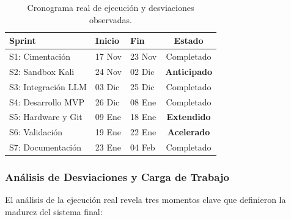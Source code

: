 \begin{table}[H]
\centering
\renewcommand{\arraystretch}{1.2}
\begin{tabular}{|l|l|l|c|}
\hline
\rowcolor[gray]{0.9} \textbf{Sprint} & \textbf{Inicio} & \textbf{Fin} & \textbf{Estado} \\ \hline
S1: Cimentación & 17 Nov & 23 Nov & Completado \\ \hline
\rowcolor[HTML]{E2EFDA} S2: Sandbox Kali & 24 Nov & 02 Dic & \textbf{Anticipado} \\ \hline
S3: Integración LLM & 03 Dic & 25 Dic & Completado \\ \hline
S4: Desarrollo MVP & 26 Dic & 08 Ene & Completado \\ \hline
\rowcolor[HTML]{FCE4D6} S5: Hardware y Git & 09 Ene & 18 Ene & \textbf{Extendido} \\ \hline
\rowcolor[HTML]{E2EFDA} S6: Validación & 19 Ene & 22 Ene & \textbf{Acelerado} \\ \hline
S7: Documentación & 23 Ene & 04 Feb & Completado \\ \hline
\end{tabular}
\caption{Cronograma real de ejecución y desviaciones observadas.}
\end{table}

\subsubsection{Análisis de Desviaciones y Carga de Trabajo}

El análisis de la ejecución real revela tres momentos clave que definieron la madurez del sistema final:

